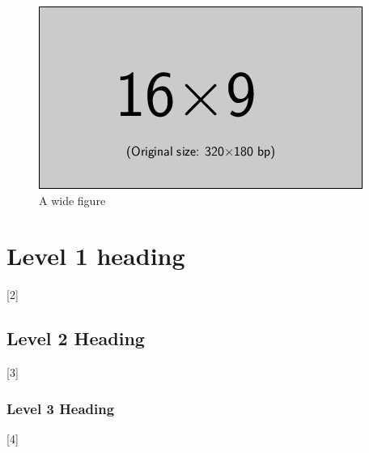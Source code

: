 \documentclass[biblatex,nonblind]{apsr_submission}
\begin{document}
\begin{figure}
\centering
\caption{A wide figure}\label{fig:wide}
\includegraphics[width=\linewidth]{example-image-16x9}
\end{figure}

\section{Level 1 heading}

[2]

\subsection{Level 2 Heading}

[3]

\subsubsection{Level 3 Heading}

[4]


%

\newpage
\printbibliography
\end{document}
